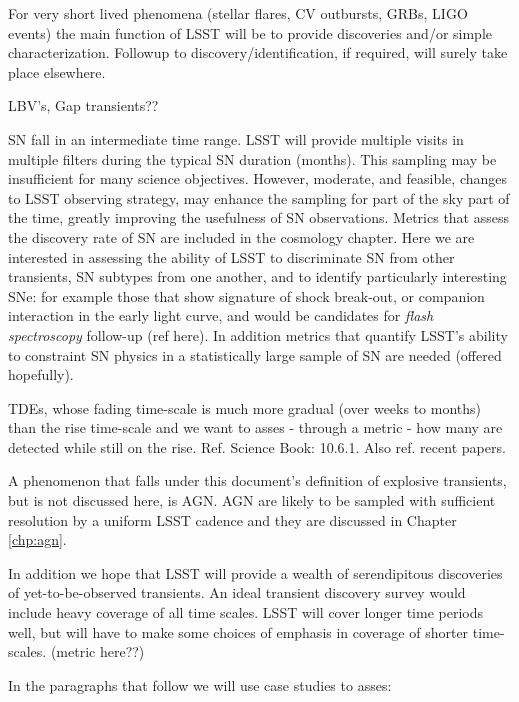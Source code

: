 For very short lived phenomena (stellar flares, CV outbursts, GRBs,
LIGO events) the main function of LSST will be to provide discoveries
and/or simple characterization.  Followup to discovery/identification,
if required, will surely take place elsewhere.

LBV's, Gap transients??

SN fall in an intermediate time range.  LSST will provide
multiple visits in multiple filters during the typical SN duration
(months).  This sampling may be insufficient for many science
objectives.  However, moderate, and feasible, changes to LSST
observing strategy, may enhance the sampling for part of the sky part
of the time, greatly improving the usefulness of SN observations. 
Metrics that assess the discovery rate of SN are included in the
cosmology chapter. Here we are interested in assessing the ability of
LSST to discriminate SN from other transients, SN subtypes from one
another, and to identify particularly interesting SNe: for example
those that show signature of shock break-out, or companion interaction
in the early light curve, and would be candidates for \emph{flash
  spectroscopy} follow-up (ref here). In addition metrics that
quantify LSST's ability to constraint SN physics in a statistically
large sample of SN are needed (offered hopefully).


TDEs, whose fading time-scale is much more gradual
(over weeks to months) than the rise time-scale and we want to asses -
through a metric - how many are detected while still on the
rise. Ref. Science Book: 10.6.1. Also ref. recent papers.

A phenomenon that falls under this document's definition of explosive
transients, but is not discussed here, is AGN. AGN are likely to be
sampled with sufficient resolution by a uniform LSST cadence and they
are discussed in Chapter \ref{chp:agn}.

In addition we hope that LSST will provide a wealth of serendipitous
discoveries of yet-to-be-observed transients.  An ideal transient
discovery survey would include heavy coverage of all time scales. LSST
will cover longer time periods well, but will have to make some
choices of emphasis in coverage of shorter time-scales. (metric
here??)


In the paragraphs that follow we will use case studies to asses:

